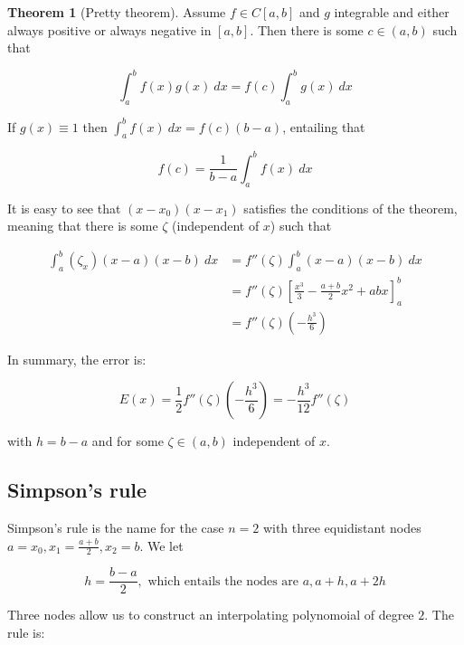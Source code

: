 \documentclass[12pt]{article}
\theoremstyle{definition}
\newtheorem{theorem}{Theorem}
\begin{document}
\begin{theorem}[Pretty theorem]
    Assume $f \in C[a,b]$ and $g$ integrable and either always positive or
    always negative in $[a, b]$. Then there is some $c \in (a, b)$ such that 

    \begin{equation*}
        \int_a^b f(x) g(x)~ dx = f(c) \int_a^b g(x) ~ dx
    \end{equation*}

    If $g(x) \equiv 1$ then $\int_a^b f(x) ~ dx = f(c)(b-a)$, entailing that 

    \begin{equation*}
        f(c) = \frac{1}{b-a}\int_a^b f(x) ~ dx
    \end{equation*}
\end{theorem}

It is easy to see that $(x - x_0)(x-x_1)$ satisfies the conditions of the
theorem, meaning that there is some $\zeta$ (independent of $x$) such that 

\begin{align*}
    \int_a^b (\zeta_x)(x-a)(x-b) ~ dx 
    &= f''(\zeta)\int_a^b(x-a)(x-b) ~ dx\\ 
    &= f''(\zeta)\left[ \frac{x^3}{3} - \frac{a+b}{2} x^2 + abx \right]_a^b\\
    &= f''(\zeta) \left( -\frac{h^3}{6} \right) 
\end{align*}

In summary, the error is:


\begin{equation*}
    E(x) = \frac{1}{2}f''(\zeta)\left( -\frac{h^3}{6} \right)  = -\frac{h^3}{12}
    f''(\zeta)
\end{equation*}

with $h = b-a$ and for some $\zeta \in (a, b)$ independent of $x$.


\subsection{Simpson's rule}

Simpson's rule is the name for the case $n = 2$ with three
equidistant nodes $a = x_0, x_1 = \frac{a+b}{2}, x_2 = b$. 
We let 

\begin{equation*}
    h = \frac{b-a}{2}, \text{   which entails the nodes are   }  a, a +h, a + 2h
\end{equation*}

Three nodes allow us to construct an interpolating polynomoial of degree $2$.
The rule is: 
\end{document}
